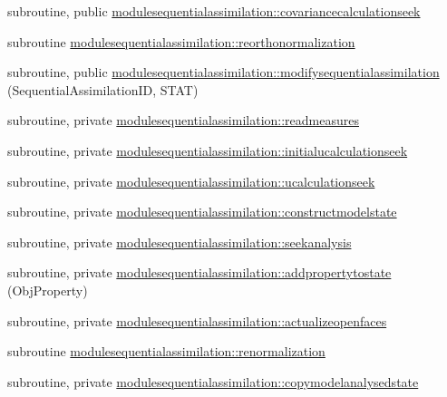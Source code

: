 \begin{DoxyCompactItemize}
\item 
subroutine, public \mbox{\hyperlink{namespacemodulesequentialassimilation_a89d62f9ba6c7cad76cf6a6dd37165fab}{modulesequentialassimilation\+::covariancecalculationseek}}
\item 
subroutine \mbox{\hyperlink{namespacemodulesequentialassimilation_aaf3bc60a00c40a50536d48987d7294dd}{modulesequentialassimilation\+::reorthonormalization}}
\item 
subroutine, public \mbox{\hyperlink{namespacemodulesequentialassimilation_a4b01359595340ca852b276b1258601df}{modulesequentialassimilation\+::modifysequentialassimilation}} (Sequential\+Assimilation\+ID, S\+T\+AT)
\item 
subroutine, private \mbox{\hyperlink{namespacemodulesequentialassimilation_a7972ca7b3c19868e67ca455d375e45af}{modulesequentialassimilation\+::readmeasures}}
\item 
subroutine, private \mbox{\hyperlink{namespacemodulesequentialassimilation_a33c7157ae5930272ff775ccd732bcb33}{modulesequentialassimilation\+::initialucalculationseek}}
\item 
subroutine, private \mbox{\hyperlink{namespacemodulesequentialassimilation_a413c75d9b44cd4a5fdf9caf890550305}{modulesequentialassimilation\+::ucalculationseek}}
\item 
subroutine, private \mbox{\hyperlink{namespacemodulesequentialassimilation_abc672947c709e077d461068b3e7ae140}{modulesequentialassimilation\+::constructmodelstate}}
\item 
subroutine, private \mbox{\hyperlink{namespacemodulesequentialassimilation_a1cda513ededcf93d8f84bd9f6e39ba43}{modulesequentialassimilation\+::seekanalysis}}
\item 
subroutine, private \mbox{\hyperlink{namespacemodulesequentialassimilation_a5cad8b44cf828f7b0f86fffd43e9f8a7}{modulesequentialassimilation\+::addpropertytostate}} (Obj\+Property)
\item 
subroutine, private \mbox{\hyperlink{namespacemodulesequentialassimilation_ad6321e8248e2b795443ddc551cbc9446}{modulesequentialassimilation\+::actualizeopenfaces}}
\item 
subroutine \mbox{\hyperlink{namespacemodulesequentialassimilation_a5ba1ccc67425087e399ba6f24403f98e}{modulesequentialassimilation\+::renormalization}}
\item 
subroutine, private \mbox{\hyperlink{namespacemodulesequentialassimilation_adcd2e5938f9991a133ebe1cf7eb7ad2f}{modulesequentialassimilation\+::copymodelanalysedstate}}
\item 

\end{DoxyCompactItemize}
